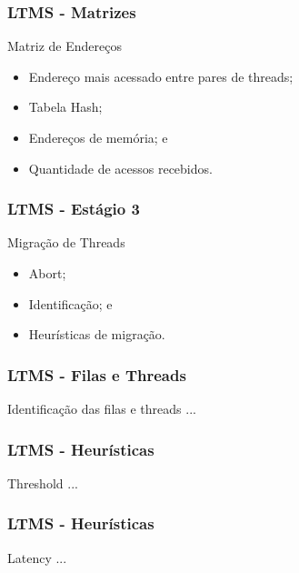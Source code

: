 \documentclass[10pt, pdf,xcolor=pdftex,dvipsnames,table]{beamer}
\begin{document}
\begin{frame} \frametitle{LTMS - Matrizes}
    \begin{block}{Matriz de Endereços}
        \begin{itemize}
        	\item Endereço mais acessado entre pares de threads;
        	\item Tabela Hash;
        	\item Endereços de memória; e 
            \item Quantidade de acessos recebidos.
        \end{itemize}
    \end{block}
\end{frame}

\begin{frame} \frametitle{LTMS - Estágio 3}
    \begin{block}{Migração de Threads}
        \begin{itemize}
        	\item Abort;
        	\item Identificação; e
            \item Heurísticas de migração.
        \end{itemize}
    \end{block}
\end{frame}

\begin{frame} \frametitle{LTMS - Filas e Threads}
    \begin{block}{Identificação das filas e threads}
        ...
    \end{block}
\end{frame}

\begin{frame} \frametitle{LTMS - Heurísticas}
    \begin{block}{Threshold}
        ...
    \end{block}
\end{frame}

\begin{frame} \frametitle{LTMS - Heurísticas}
    \begin{block}{Latency}
        ...
    \end{block}
\end{frame}
\end{document}
